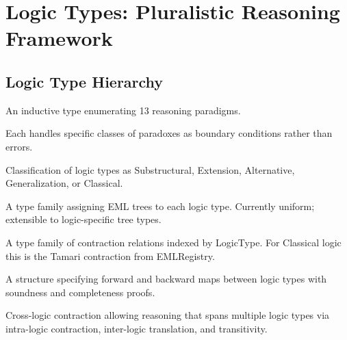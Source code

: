 \chapter{Logic Types: Pluralistic Reasoning Framework}

\section{Logic Type Hierarchy}

\begin{definition}
\label{def:logictype}
\leanok
An inductive type enumerating 13 reasoning paradigms.

Each handles specific classes of paradoxes as boundary conditions rather than errors.
\end{definition}

\begin{definition}
\label{def:logicclass}
\leanok
{}
Classification of logic types as Substructural, Extension, Alternative, Generalization, or Classical.
\end{definition}

\begin{definition}
\label{def:logictree}
\leanok
{}
A type family assigning EML trees to each logic type. Currently uniform; extensible to logic-specific tree types.
\end{definition}

\begin{definition}
\label{def:logiccontraction}
\leanok
{}
A type family of contraction relations indexed by \textsf{LogicType}. For Classical logic this is the Tamari contraction from EMLRegistry.
\end{definition}

\begin{definition}
\label{def:translation}
\leanok
{}
A structure specifying forward and backward maps between logic types with soundness and completeness proofs.
\end{definition}

\begin{definition}
\label{def:metacontracts}
\leanok
{}
Cross-logic contraction allowing reasoning that spans multiple logic types via intra-logic contraction, inter-logic translation, and transitivity.
\end{definition}

